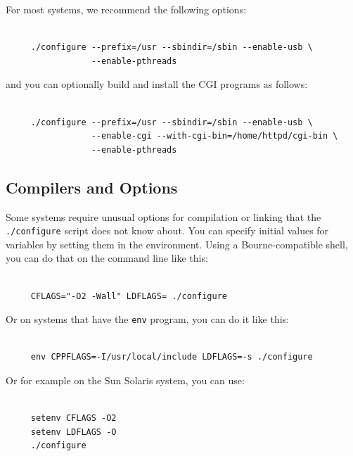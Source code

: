 For most systems, we recommend the following options: 

\footnotesize
\begin{verbatim}
     
     ./configure --prefix=/usr --sbindir=/sbin --enable-usb \
                 --enable-pthreads
\end{verbatim}
\normalsize

and you can optionally build and install the CGI programs as follows: 

\footnotesize
\begin{verbatim}
     
     ./configure --prefix=/usr --sbindir=/sbin --enable-usb \
                 --enable-cgi --with-cgi-bin=/home/httpd/cgi-bin \
                 --enable-pthreads
\end{verbatim}
\normalsize

\label{Compilers-and-Options}

\subsection*{Compilers and Options}
\index{Options!Compilers and }

\label{index-compiler-options-30}
Some systems require unusual options for compilation or linking that the {\tt
./configure} script does not know about. You can specify initial values for
variables by setting them in the environment. Using a Bourne-compatible shell,
you can do that on the command line like this: 

\footnotesize
\begin{verbatim}
     
     CFLAGS="-O2 -Wall" LDFLAGS= ./configure
\end{verbatim}
\normalsize

Or on systems that have the {\tt env} program, you can do it like this: 

\footnotesize
\begin{verbatim}
     
     env CPPFLAGS=-I/usr/local/include LDFLAGS=-s ./configure
\end{verbatim}
\normalsize

Or for example on the Sun Solaris system, you can use: 

\footnotesize
\begin{verbatim}
     
     setenv CFLAGS -O2
     setenv LDFLAGS -O
     ./configure
\end{verbatim}
\normalsize

